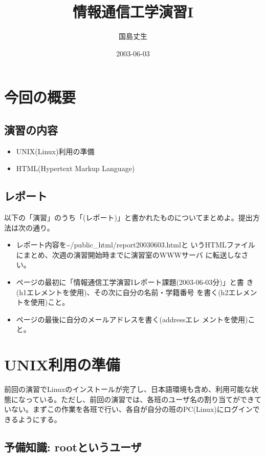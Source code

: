 \documentclass[a4j,10pt]{jarticle}
\begin{document}
\title{情報通信工学演習I}
\author{国島丈生}
\date{2003-06-03}
\maketitle

\section{今回の概要}
\subsection{演習の内容}
\begin{itemize}
 \item UNIX(Linux)利用の準備
 \item HTML(Hypertext Markup Language)
\end{itemize}

\subsection{レポート}
以下の「演習」のうち「(レポート)」と書かれたものについてまとめよ。提出方
法は次の通り。
\begin{itemize}
 \item レポート内容を{\sffamily \~{}/public\_html/report20030603.html}と
       いうHTMLファイルにまとめ、次週の演習開始時までに演習室のWWWサーバ
       に転送しなさい。
 \item ページの最初に「情報通信工学演習Iレポート課題(2003-06-03分)」と書
       き({\sffamily h1}エレメントを使用)、その次に自分の名前・学籍番号
       を書く({\sffamily h2エレメントを使用})こと。
 \item ページの最後に自分のメールアドレスを書く({\sffamily address}エレ
       メントを使用)こと。
\end{itemize}

\clearpage

\section{UNIX利用の準備}

前回の演習でLinuxのインストールが完了し、日本語環境も含め、利用可能な状
態になっている。ただし、前回の演習では、各班のユーザ名の割り当てができて
いない。まずこの作業を各班で行い、各自が自分の班のPC(Linux)にログインで
きるようにする。

\subsection{予備知識: rootというユーザ}
\end{document}

